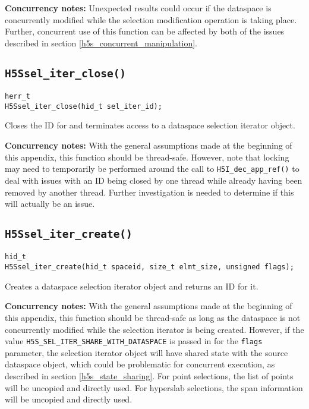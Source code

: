 \documentclass[../HDF5_RFC.tex]{subfiles}
\begin{document}
\textbf{Concurrency notes:} Unexpected results could occur if the dataspace is concurrently
modified while the selection modification operation is taking place. Further, concurrent use
of this function can be affected by both of the issues described in section 
\ref{h5s_concurrent_manipulation}.

\subsection{\texttt{H5Ssel\_iter\_close()}}
\label{apdx:h5s_func_h5ssel_iter_close}

\begin{verbatim}
herr_t
H5Ssel_iter_close(hid_t sel_iter_id);
\end{verbatim}

Closes the ID for and terminates access to a dataspace selection iterator object.

\textbf{Concurrency notes:} With the general assumptions made at the beginning of this
appendix, this function should be thread-safe. However, note that locking may need to
temporarily be performed around the call to \texttt{H5I\_dec\_app\_ref()} to deal with
issues with an ID being closed by one thread while already having been removed by another
thread. Further investigation is needed to determine if this will actually be an issue.

\subsection{\texttt{H5Ssel\_iter\_create()}}
\label{apdx:h5s_func_h5ssel_iter_create}

\begin{verbatim}
hid_t
H5Ssel_iter_create(hid_t spaceid, size_t elmt_size, unsigned flags);
\end{verbatim}

Creates a dataspace selection iterator object and returns an ID for it.

\textbf{Concurrency notes:} With the general assumptions made at the beginning of this
appendix, this function should be thread-safe as long as the dataspace is not concurrently
modified while the selection iterator is being created. However, if the value
\texttt{H5S\_SEL\_ITER\_SHARE\_WITH\_DATASPACE} is passed in for the \texttt{flags} parameter,
the selection iterator object will have shared state with the source dataspace object, which
could be problematic for concurrent execution, as described in section \ref{h5s_state_sharing}.
For point selections, the list of points will be uncopied and directly used. For hyperslab
selections, the span information will be uncopied and directly used.
\end{document}
